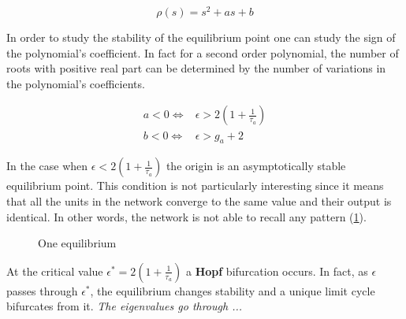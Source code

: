 \begin{equation}
\rho(s) = s^2 + as +b
\end{equation}

In order to study the stability of the equilibrium point one can study the sign of the polynomial's coefficient. In fact for a second order polynomial, the number of roots with positive real part can be determined by the number of variations in the polynomial's coefficients.

\begin{equation}
\begin{aligned}
 a < 0 \iff & \epsilon > 2(1 + \frac{1}{\tau_a}) \\
 b < 0 \iff & \epsilon > g_a + 2
\end{aligned}
\end{equation}

In the case when $\epsilon<2(1+\frac{1}{\tau_a})$ the origin is an asymptotically stable equilibrium point. This condition is not particularly interesting since it means that all the units in the network converge to the same value and their output is identical. In other words, the network is not able to recall any pattern (\cref{fig:eq2D_focus}).

\begin{figure}[!h]
        \caption{\label{fig:eq2D_focus} One equilibrium}
\end{figure}


At the critical value $\epsilon^* = 2 ( 1 + \frac{1}{\tau_a} ) $ a \textbf{Hopf} bifurcation occurs. In fact, as $\epsilon$ passes through $\epsilon^*$, the equilibrium changes stability and a unique limit cycle bifurcates from it. \textit{The eigenvalues go through ...}

